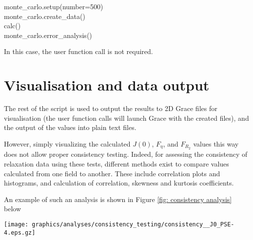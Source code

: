 \begin{exampleenv}
monte\_carlo.setup(number=500) \\
monte\_carlo.create\_data() \\
calc() \\
monte\_carlo.error\_analysis()
\end{exampleenv}

In this case, the  user function call is not required.



\section{Visualisation and data output}

The rest of the script is used to output the results to 2D Grace files for visualisation (the  user function calls will launch Grace with the created files), and the output of the values into plain text files.

However, simply visualizing the calculated $J(0)$, $F_\eta$, and $F_{R_2}$ values this way does not allow proper consistency testing. Indeed, for assessing the consistency of relaxation data using these tests, different methods exist to compare values calculated from one field to another.  These include correlation plots and histograms, and calculation of correlation, skewness and kurtosis coefficients.

An example of such an analysis is shown in Figure \ref{fig: consistency analysis} below

\begin{figure*}[h]
\label{fig: consistency analysis}
\texttt{[image: graphics/analyses/consistency\_testing/consistency\_\_J0\_PSE-4.eps.gz]}
\caption[Example of consistency testing visual analysis]{Example of consistency testing visual analysis. Relaxation data from three different magnetic fields are compared. For each pair of magnetic field, a correlation plot of the calculated $J(0)$ values (top) as well as an histogram of the ration of calculated $J(0)$ values (bottom) are shown.}
\end{figure*}

